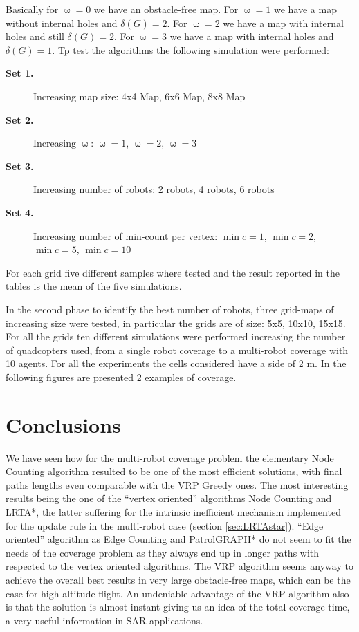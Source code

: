 Basically for $\upomega=0$ we have an obstacle-free map. For  $\upomega=1$ we have a map without internal holes and $\delta (G)=2$. For $\upomega=2$ we have a map with internal holes and still $\delta (G)=2$. For  $\upomega=3$ we have a map with internal holes and $\delta (G)=1$.
Tp test the algorithms the following simulation were performed:
\begin{description}
\item[\textbf{Set 1.}] Increasing map size: 4x4 Map, 6x6 Map, 8x8 Map
\item[\textbf{Set 2.}] Increasing $\upomega$:  $\upomega=1$, $\upomega=2$,  $\upomega=3$
\item[\textbf{Set 3.}] Increasing number of robots: 2 robots, 4 robots, 6 robots
\item[\textbf{Set 4.}] Increasing number of min-count per vertex: \mbox{$\min c=1$}, \mbox{$\min c =2$}, \mbox{$\min c =5$}, \mbox{$\min c =10$}
\end{description}

For each grid five different samples where tested and the result reported in the tables is the mean of the five simulations.

In the second phase to identify the best number of robots, three grid-maps of increasing size were tested, in particular the grids are of size: 5x5, 10x10, 15x15. For all the grids ten different simulations were performed increasing the number of quadcopters used, from a single robot coverage to a multi-robot coverage with 10 agents. For all the experiments the cells considered have a side of 2 m. In the following figures are presented 2 examples of coverage.





\pagebreak




\pagebreak


\section{Conclusions}
We have seen how for the multi-robot coverage problem the elementary Node Counting algorithm resulted to be one of the most efficient solutions, with final paths lengths even comparable with the VRP Greedy ones. The most interesting results being the one of the ``vertex oriented'' algorithms Node Counting and LRTA*, the latter suffering for the intrinsic inefficient mechanism implemented for the update rule in the multi-robot case (section \ref{sec:LRTAstar}). ``Edge oriented'' algorithm as Edge Counting and PatrolGRAPH* do not seem to fit the needs of the coverage problem as they always end up in longer paths with respected to the vertex oriented algorithms.
The VRP algorithm seems anyway to achieve the overall best results in very large obstacle-free maps, which can be the case for high altitude flight. An undeniable advantage of the VRP algorithm also is that the solution is almost instant giving us an idea of the total coverage time, a very useful information in SAR applications.


